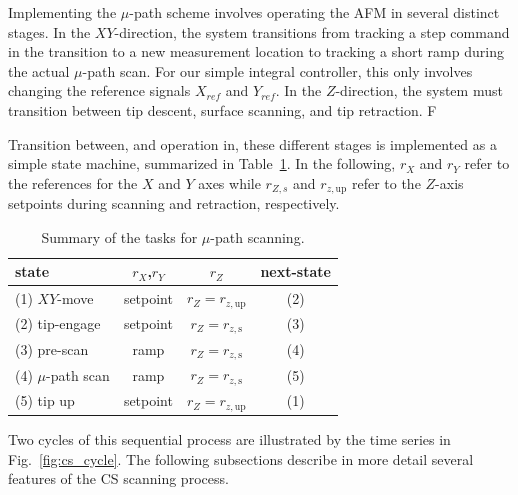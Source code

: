 \documentclass[twocolumn,oneside]{IEEEtran/IEEEtran}
\newcommand{\rzup}{\ensuremath{r_{z,\textrm{up}}}\xspace}
\newcommand{\rzs}{\ensuremath{r_{z,\textrm{s}}}\xspace}
\begin{document}
Implementing the $\mu$-path scheme involves operating the AFM in
several distinct stages. In the $XY$-direction, the system transitions
from tracking a step command in the transition to a new
measurement location to tracking a short ramp during the actual $\mu$-path scan.
For our simple integral controller, this only involves changing the reference signals
$X_{ref}$ and $Y_{ref}$. In the $Z$-direction, the system must
transition between tip descent, surface scanning, and tip retraction. F
	
Transition between, and operation in, these different stages is
implemented as a simple state machine, summarized in
Table~\ref{tab:cs_tasks}. In the following, $r_X$ and $r_Y$ refer to
the references for the $X$ and $Y$ axes while $r_{Z,s}$ and $\rzup$
refer to the $Z$-axis setpoints during scanning and retraction,
respectively.

\begin{table}
  \centering
  \caption{Summary of the tasks for $\mu$-path scanning.}
  \begin{tabular}{lccc}
    state & $r_X$,$r_Y$ & $r_Z$ & next-state\\
    \toprule
    (1) $XY$-move & setpoint & $r_Z = \rzup$ & (2)\\
    (2) tip-engage & setpoint & $r_Z = \rzs$ & (3)\\
    (3) pre-scan & ramp & $r_Z = \rzs$ & (4)\\
    (4) $\mu$-path scan & ramp & $r_Z = \rzs$ & (5)\\
    (5) tip up & setpoint & $r_Z = \rzup$ & (1)\\
  \end{tabular}
  \label{tab:cs_tasks}
\end{table}
Two cycles of this sequential process are illustrated by the time
series in Fig.~\ref{fig:cs_cycle}. The following
subsections describe in more detail several features of the CS
scanning process.
  
\end{document}
